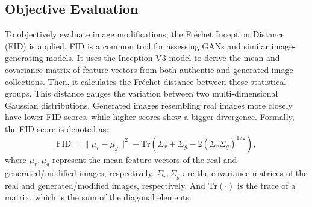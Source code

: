 \begin{spacing}{1.5}
\subsection{Objective Evaluation}
To objectively evaluate image modifications, the Fréchet Inception Distance (FID) is applied. FID is a common tool for assessing GANs and similar image-generating models. It uses the Inception V3\cite{DBLP:conf/cvpr/SzegedyVISW16} model to derive the mean and covariance matrix of feature vectors from both authentic and generated image collections. Then, it calculates the Fréchet distance between these statistical groups. This distance gauges the variation between two multi-dimensional Gaussian distributions. Generated images resembling real images more closely have lower FID scores, while higher scores show a bigger divergence. Formally, the FID score is denoted as:
\begin{equation}
    \text{FID} = \|\mu_r - \mu_g\|^2 + \text{Tr}(\Sigma_r + \Sigma_g - 2(\Sigma_r\Sigma_g)^{1/2}),
\end{equation}
where $\mu_r, \mu_g$ represent the mean feature vectors of the real and generated/modified images, respectively. $\Sigma_r, \Sigma_g$ are the covariance matrices of the real and generated/modified images, respectively. And $\text{Tr}(\cdot)$ is the trace of a matrix, which is the sum of the diagonal elements.

\end{spacing}
